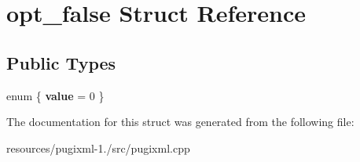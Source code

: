 \hypertarget{structopt__false}{\section{opt\+\_\+false Struct Reference}
\label{structopt__false}
}
\subsection*{Public Types}
\begin{DoxyCompactItemize}
\item 
\hypertarget{structopt__false_adf1eb3ad7c3e284bd861d80d6817174f}{enum \{ {\bfseries value} = 0
 \}}\label{structopt__false_adf1eb3ad7c3e284bd861d80d6817174f}

\end{DoxyCompactItemize}


The documentation for this struct was generated from the following file\+:\begin{DoxyCompactItemize}
\item 
resources/pugixml-\/1./src/pugixml.\+cpp\end{DoxyCompactItemize}
